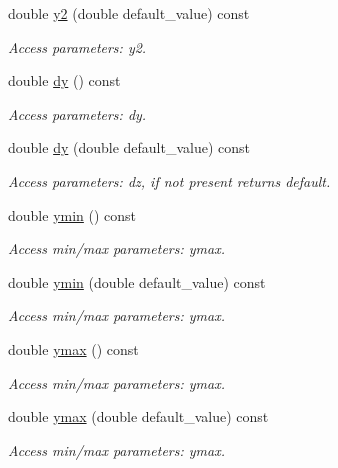 \begin{DoxyCompactItemize}
double \hyperlink{struct_d_d4hep_1_1_x_m_l_1_1_dimension_a1532c8a10f1c2b33e14cacbdec3e919e}{y2} (double default\+\_\+value) const
\begin{DoxyCompactList}\small\item\em Access parameters\+: y2. \end{DoxyCompactList}\item 
double \hyperlink{struct_d_d4hep_1_1_x_m_l_1_1_dimension_afdeca8ab0517a67b30a113805bf6a11a}{dy} () const
\begin{DoxyCompactList}\small\item\em Access parameters\+: dy. \end{DoxyCompactList}\item 
double \hyperlink{struct_d_d4hep_1_1_x_m_l_1_1_dimension_ac2cf9662f6c8fcc95ed4b4a5a5c58336}{dy} (double default\+\_\+value) const
\begin{DoxyCompactList}\small\item\em Access parameters\+: dz, if not present returns default. \end{DoxyCompactList}\item 
double \hyperlink{struct_d_d4hep_1_1_x_m_l_1_1_dimension_a4b510b61553ae94f7a3b731c18c87f99}{ymin} () const
\begin{DoxyCompactList}\small\item\em Access min/max parameters\+: ymax. \end{DoxyCompactList}\item 
double \hyperlink{struct_d_d4hep_1_1_x_m_l_1_1_dimension_a63f99e17a66e6ee065cd3d63b880cdca}{ymin} (double default\+\_\+value) const
\begin{DoxyCompactList}\small\item\em Access min/max parameters\+: ymax. \end{DoxyCompactList}\item 
double \hyperlink{struct_d_d4hep_1_1_x_m_l_1_1_dimension_a48dfd737c45a6fd50b0b4e758bd86dbf}{ymax} () const
\begin{DoxyCompactList}\small\item\em Access min/max parameters\+: ymax. \end{DoxyCompactList}\item 
double \hyperlink{struct_d_d4hep_1_1_x_m_l_1_1_dimension_a617f306544c5e8b366f1d417649a457e}{ymax} (double default\+\_\+value) const
\begin{DoxyCompactList}\small\item\em Access min/max parameters\+: ymax. \end{DoxyCompactList}\item 

\end{DoxyCompactItemize}
